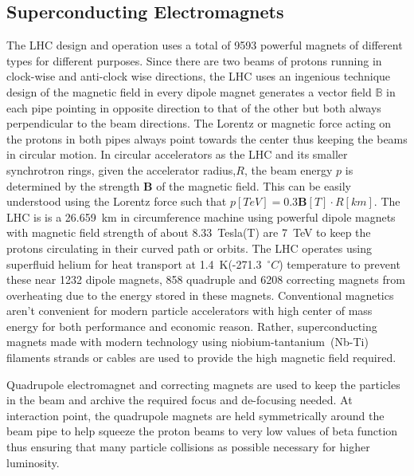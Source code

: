 \subsection{Superconducting Electromagnets}
The LHC design and operation uses a total of 9593 powerful magnets of different types for different purposes. Since there are two beams of protons running in clock-wise and anti-clock wise directions, the LHC uses an ingenious technique design  of the magnetic field in every dipole magnet generates a vector field $\mathbb{B}$ in each pipe pointing in opposite direction to that of the other but both always perpendicular to the beam directions. The Lorentz or magnetic force acting on the protons in both pipes always point towards the center thus keeping the beams in circular motion. In circular accelerators as the LHC and its smaller synchrotron rings, given the accelerator radius,$R$, the beam energy $p$ is determined by the strength $\mathbf{B}$ of the magnetic field. This can be easily understood using the Lorentz force  such that $\displaystyle{p[TeV] = 0.3\mathbf{B}[T]\cdot R[km] }$.
The LHC is is a 26.659~km in circumference machine using powerful dipole magnets with magnetic field strength of about 8.33~Tesla(T) are 7~TeV to keep the protons circulating in their curved path or orbits. The LHC operates using superfluid helium for heat transport at 1.4~K(-271.3~$^{\circ}C$)  temperature to prevent these near 1232 dipole magnets, 858 quadruple and 6208 correcting magnets from overheating due to the energy stored in these magnets. Conventional magnetics aren't convenient for modern particle accelerators with high center of mass energy for both performance and economic reason. Rather, superconducting magnets made with modern technology using  niobium-tantanium~(Nb-Ti) filaments strands or cables are used to provide the high magnetic field required. 

Quadrupole electromagnet and correcting magnets are  used to keep the particles in the beam and archive the required focus and de-focusing needed. At interaction point, the quadrupole magnets are held symmetrically around the beam pipe to help squeeze the proton beams to very low values of beta function thus ensuring that many particle collisions as possible necessary for higher luminosity.



